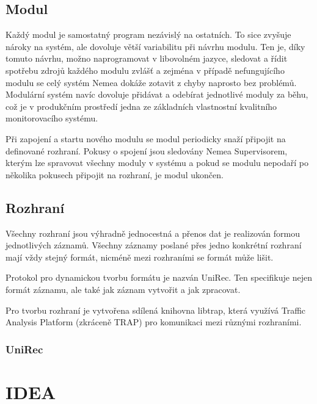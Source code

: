 
\subsection{Modul}

Každý modul je samostatný program nezávislý na ostatních. To sice zvyšuje nároky na systém, ale dovoluje větší variabilitu při návrhu modulu. Ten je, díky tomuto návrhu, možno naprogramovat v libovolném jazyce, sledovat a řídit spotřebu zdrojů každého modulu zvlášť a zejména v případě nefungujícího modulu se celý systém Nemea dokáže zotavit z chyby naprosto bez problémů. Modulární systém navíc dovoluje přidávat a odebírat jednotlivé moduly za běhu, což je v produkčním prostředí jedna ze základních vlastnostní kvalitního monitorovacího systému.

Při zapojení a startu nového modulu se modul periodicky snaží připojit na definované rozhraní. Pokusy o spojení jsou sledovány Nemea Supervisorem, kterým lze spravovat všechny moduly v systému a pokud se modulu nepodaří po několika pokusech připojit na rozhraní, je modul ukončen.

\subsection{Rozhraní}

Všechny rozhraní jsou výhradně jednocestná a přenos dat je realizován formou jednotlivých záznamů. Všechny záznamy poslané přes jedno konkrétní rozhraní mají vždy stejný formát, nicméně mezi rozhraními se formát může lišit. 

Protokol pro dynamickou tvorbu formátu je nazván UniRec. Ten specifikuje nejen formát záznamu, ale také jak záznam vytvořit a jak zpracovat.

Pro tvorbu rozhraní je vytvořena sdílená knihovna libtrap, která využívá Traffic Analysis Platform (zkráceně TRAP) pro komunikaci mezi různými rozhraními.

\subsubsection{UniRec}

\section{IDEA}
\label{sec:idea}

